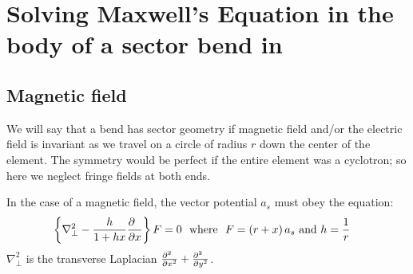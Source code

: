 
\chapter{Solving Maxwell's Equation in the body of a sector bend in \PTC\  }
\label{app:max}


%

\resetptclinenumber
{}


\section{Magnetic field}


We will say that a bend has sector geometry if magnetic field and/or the electric field is invariant as we travel on a circle of radius $r$ down the center of the
element. The symmetry would be perfect if the entire element was a cyclotron; so here we neglect fringe fields at both ends.

In the case of a magnetic field, the vector potential $a_s$ must obey the equation:
%
%
\begin{eqnarray}\left\{{{\nabla }_{\perp }^{2}-{h \over 1+hx}{\partial \hphantom{x} \over \partial x}}\right\}F&=0~~{\text w}{\text h}{\text e}{\text r}{\text e}~~F=\left({r+x}\right){a}_{s}~{\text a}{\text n}{\text d} ~h=
{1 \over r}\label{eq:maxb}\end{eqnarray}
%
%
%
${\nabla }_{\perp }^{2}$
is the transverse Laplacian %
${{\partial }^{2}\hphantom{x} \over {\partial x}^{2}}+{{\partial }^{2}\hphantom{x} \over {\partial y}^{2}}$.

